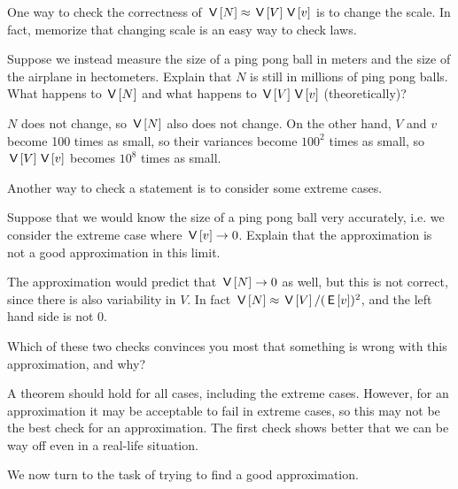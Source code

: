 \documentclass[assignments]{subfiles}
\begin{document}
One way to check the correctness of $\,\mathsf{V}\left[N\right] \approx \,\mathsf{V}\left[V\right] \,\mathsf{V}\left[v\right]$ is to change the scale. In fact, memorize that changing scale is an easy way to check laws.

\begin{exercise}
Suppose we instead measure the size of a ping pong ball in meters and the size of the airplane in hectometers.
Explain that $N$ is still in millions of ping pong balls.
What happens to $\,\mathsf{V}\left[N\right]$ and what happens to $\,\mathsf{V}\left[V\right] \,\mathsf{V}\left[v\right]$ (theoretically)?
\begin{solution}
$N$ does not change, so $\,\mathsf{V}\left[N\right]$ also does not change. On the other hand, $V$ and $v$ become 100 times as small, so their variances become $100^2$ times as small, so $\,\mathsf{V}\left[V\right] \,\mathsf{V}\left[v\right]$ becomes $10^8$ times as small.
\end{solution}
\end{exercise}


Another way to check a statement is to consider some extreme cases.

\begin{exercise} Suppose that we would know the size of a ping pong ball very accurately, i.e.  we consider the extreme case where $\,\mathsf{V}\left[v\right] \rightarrow 0$. Explain that the approximation is not a good approximation in this limit.
\begin{solution}
The approximation would predict that $\,\mathsf{V}\left[N\right] \to 0$ as well, but this is not correct, since there is also variability in $V$. In fact $\,\mathsf{V}\left[N\right] \approx \,\mathsf{V}\left[V\right] / (\,\mathsf{E}\left[v\right])^2$, and the left hand side is not 0.
\end{solution}
\end{exercise}


\begin{exercise}
Which of these two checks convinces you most that something is wrong with this approximation, and why?
\begin{solution}
A theorem should hold for all cases, including the extreme cases. However, for an approximation it may be acceptable to fail in extreme cases, so this may not be the best check for an approximation. The first check shows better that we can be way off even in a real-life situation. \\
\end{solution}
\end{exercise}

We now turn to the task of trying to find a good approximation.
\end{document}
